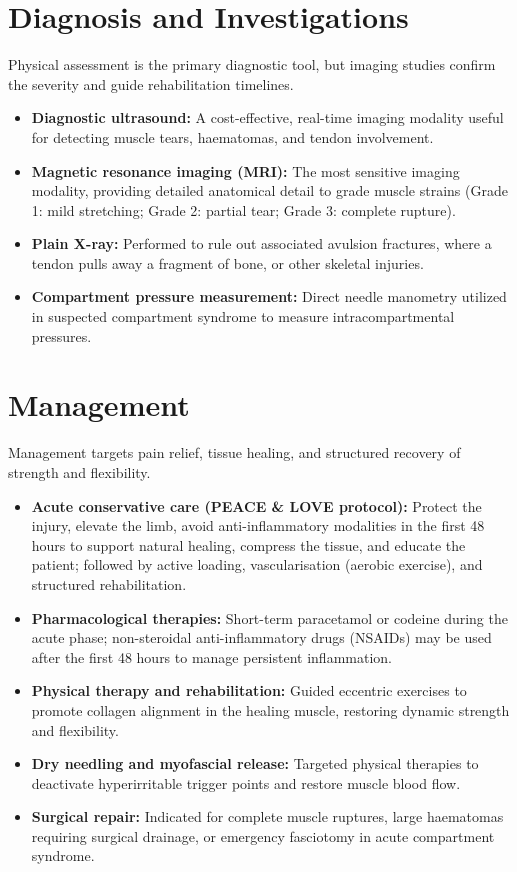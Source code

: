 \section*{Diagnosis and Investigations}
Physical assessment is the primary diagnostic tool, but imaging studies confirm the severity and guide rehabilitation timelines.
\begin{itemize}
    \item \textbf{Diagnostic ultrasound:} A cost-effective, real-time imaging modality useful for detecting muscle tears, haematomas, and tendon involvement.
    \item \textbf{Magnetic resonance imaging (MRI):} The most sensitive imaging modality, providing detailed anatomical detail to grade muscle strains (Grade 1: mild stretching; Grade 2: partial tear; Grade 3: complete rupture).
    \item \textbf{Plain X-ray:} Performed to rule out associated avulsion fractures, where a tendon pulls away a fragment of bone, or other skeletal injuries.
    \item \textbf{Compartment pressure measurement:} Direct needle manometry utilized in suspected compartment syndrome to measure intracompartmental pressures.
\end{itemize}

\section*{Management}
Management targets pain relief, tissue healing, and structured recovery of strength and flexibility.
\begin{itemize}
    \item \textbf{Acute conservative care (PEACE \& LOVE protocol):} Protect the injury, elevate the limb, avoid anti-inflammatory modalities in the first 48 hours to support natural healing, compress the tissue, and educate the patient; followed by active loading, vascularisation (aerobic exercise), and structured rehabilitation.
    \item \textbf{Pharmacological therapies:} Short-term paracetamol or codeine during the acute phase; non-steroidal anti-inflammatory drugs (NSAIDs) may be used after the first 48 hours to manage persistent inflammation.
    \item \textbf{Physical therapy and rehabilitation:} Guided eccentric exercises to promote collagen alignment in the healing muscle, restoring dynamic strength and flexibility.
    \item \textbf{Dry needling and myofascial release:} Targeted physical therapies to deactivate hyperirritable trigger points and restore muscle blood flow.
    \item \textbf{Surgical repair:} Indicated for complete muscle ruptures, large haematomas requiring surgical drainage, or emergency fasciotomy in acute compartment syndrome.
\end{itemize}


